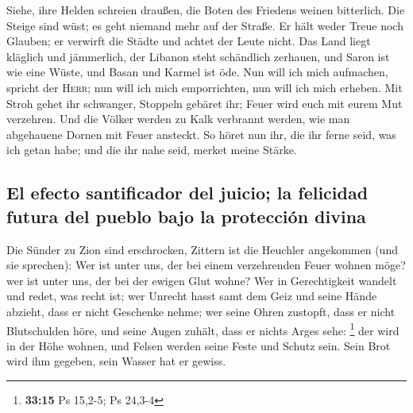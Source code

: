  Siehe, ihre Helden schreien draußen, die Boten des
Friedens weinen bitterlich.  Die Steige sind wüst; es geht
niemand mehr auf der Straße. Er hält weder Treue noch Glauben; er
verwirft die Städte und achtet der Leute nicht.  Das Land
liegt kläglich und jämmerlich, der Libanon steht schändlich zerhauen,
und Saron ist wie eine Wüste, und Basan und Karmel ist öde.
 Nun will ich mich aufmachen, spricht der \textsc{Herr};
nun will ich mich emporrichten, nun will ich mich erheben.
 Mit Stroh gehet ihr schwanger, Stoppeln gebäret ihr;
Feuer wird euch mit eurem Mut verzehren.  Und die Völker
werden zu Kalk verbrannt werden, wie man abgehauene Dornen mit Feuer
ansteckt.  So höret nun ihr, die ihr ferne seid, was ich
getan habe; und die ihr nahe seid, merket meine Stärke.

\hypertarget{el-efecto-santificador-del-juicio-la-felicidad-futura-del-pueblo-bajo-la-protecciuxf3n-divina}{%
\subsection{El efecto santificador del juicio; la felicidad futura del
pueblo bajo la protección
divina}\label{el-efecto-santificador-del-juicio-la-felicidad-futura-del-pueblo-bajo-la-protecciuxf3n-divina}}

 Die Sünder zu Zion sind erschrocken, Zittern ist die
Heuchler angekommen (und sie sprechen): Wer ist unter uns, der bei einem
verzehrenden Feuer wohnen möge? wer ist unter uns, der bei der ewigen
Glut wohne?  Wer in Gerechtigkeit wandelt und redet, was
recht ist; wer Unrecht hasst samt dem Geiz und seine Hände abzieht, dass
er nicht Geschenke nehme; wer seine Ohren zustopft, dass er nicht
Blutschulden höre, und seine Augen zuhält, dass er nichts Arges sehe:
\footnote{\textbf{33:15} Ps 15,2-5; Ps 24,3-4}  der wird
in der Höhe wohnen, und Felsen werden seine Feste und Schutz sein. Sein
Brot wird ihm gegeben, sein Wasser hat er gewiss.

